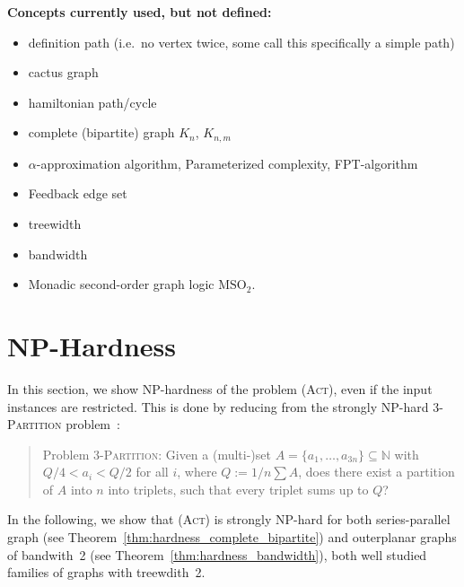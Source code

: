 \documentclass[runningheads]{llncs}
\numberwithin{equation}{section}
\newcommand{\N}{\mathbb{N}}
\newcommand{\set}[1]{\{ #1 \}}
\newcommand{\act}{\textsc{(Act)}}
\begin{document}
\textbf{ Concepts currently used, but not defined: }
\begin{itemize}
\item definition path (i.e.\ no vertex twice, some call this specifically a simple path)
\item cactus graph
\item hamiltonian path/cycle
\item complete (bipartite) graph $K_n$, $K_{n,m}$
\item $\alpha$-approximation algorithm, Parameterized complexity, FPT-algorithm
\item Feedback edge set
\item treewidth
\item bandwidth
\item Monadic second-order graph logic $\text{MSO}_2$.
\end{itemize}

\section{NP-Hardness}
\label{sec:hardness}

In this section, we show NP-hardness of the problem {\act}, even if the input instances are restricted. 
This is done by reducing from the strongly NP-hard \textsc{3-Partition} problem~\cite{garey1979computers}: 


\begin{quote}

Problem \textsc{3-Partition}: Given a (multi-)set $A = \set{a_1, \ldots, a_{3n}} \subseteq \N$ with $Q/4 < a_i < Q/2$ for all $i$, where $Q := 1/n \sum A$, does there exist a partition of $A$ into $n$ into triplets, such that every triplet sums up to $Q$?

\end{quote}

In the following, we show that {\act} is strongly NP-hard for both series-parallel graph (see Theorem~\ref{thm:hardness_complete_bipartite}) and 
outerplanar graphs of bandwith~2 (see Theorem~\ref{thm:hardness_bandwidth}), both well studied families of 
graphs with treewdith~2.
\end{document}
